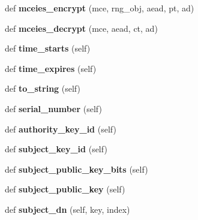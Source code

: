 \begin{DoxyCompactItemize}
\item 
\mbox{\label{namespacebotan2_ab12f88af8a66ec6ef77ca91215c596ac}} 
def {\bfseries mceies\+\_\+encrypt} (mce, rng\+\_\+obj, aead, pt, ad)
\item 
\mbox{\label{namespacebotan2_a3eace7996663871c95ac63179920f8e6}} 
def {\bfseries mceies\+\_\+decrypt} (mce, aead, ct, ad)
\item 
\mbox{\label{namespacebotan2_a85dc1eefc40bf00b79c81c021fe75f8a}} 
def {\bfseries time\+\_\+starts} (self)
\item 
\mbox{\label{namespacebotan2_ada4c27ad339d38a01021b3dce10e4172}} 
def {\bfseries time\+\_\+expires} (self)
\item 
\mbox{\label{namespacebotan2_a748a4dd3f986228a35d58836b26b6f37}} 
def {\bfseries to\+\_\+string} (self)
\item 
\mbox{\label{namespacebotan2_a32585b90839179c1ebea1dd4a9d487ea}} 
def {\bfseries serial\+\_\+number} (self)
\item 
\mbox{\label{namespacebotan2_a7636a59afdcd70d57ffc5f51613a32c9}} 
def {\bfseries authority\+\_\+key\+\_\+id} (self)
\item 
\mbox{\label{namespacebotan2_a97c82d9d6f544906e5d5b43ba6049a8d}} 
def {\bfseries subject\+\_\+key\+\_\+id} (self)
\item 
\mbox{\label{namespacebotan2_ad0c88c34f26051fdbdba16cb57851999}} 
def {\bfseries subject\+\_\+public\+\_\+key\+\_\+bits} (self)
\item 
\mbox{\label{namespacebotan2_a83d1ff2dcc532e9277624652d4eed911}} 
def {\bfseries subject\+\_\+public\+\_\+key} (self)
\item 
\mbox{\label{namespacebotan2_a3fc15ad2e3a1f13980d130925fd83901}} 
def {\bfseries subject\+\_\+dn} (self, key, index)
\end{DoxyCompactItemize}
